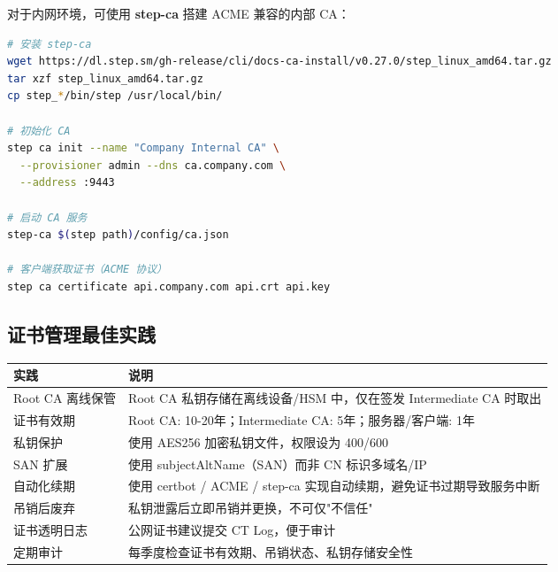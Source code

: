 \documentclass[12pt,UTF8]{ctexbook}
\begin{document}
对于内网环境，可使用 \textbf{step-ca} 搭建 ACME 兼容的内部 CA：

\begin{lstlisting}[language=bash]
# 安装 step-ca
wget https://dl.step.sm/gh-release/cli/docs-ca-install/v0.27.0/step_linux_amd64.tar.gz
tar xzf step_linux_amd64.tar.gz
cp step_*/bin/step /usr/local/bin/

# 初始化 CA
step ca init --name "Company Internal CA" \
  --provisioner admin --dns ca.company.com \
  --address :9443

# 启动 CA 服务
step-ca $(step path)/config/ca.json

# 客户端获取证书（ACME 协议）
step ca certificate api.company.com api.crt api.key
\end{lstlisting}

\subsection{证书管理最佳实践}

\begin{tabular}{|p{3.5cm}|p{8.5cm}|}
\hline
\textbf{实践} & \textbf{说明} \\
\hline
Root CA 离线保管 & Root CA 私钥存储在离线设备/HSM 中，仅在签发 Intermediate CA 时取出 \\
\hline
证书有效期 & Root CA: 10-20年；Intermediate CA: 5年；服务器/客户端: 1年 \\
\hline
私钥保护 & 使用 AES256 加密私钥文件，权限设为 400/600 \\
\hline
SAN 扩展 & 使用 subjectAltName（SAN）而非 CN 标识多域名/IP \\
\hline
自动化续期 & 使用 certbot / ACME / step-ca 实现自动续期，避免证书过期导致服务中断 \\
\hline
吊销后废弃 & 私钥泄露后立即吊销并更换，不可仅"不信任" \\
\hline
证书透明日志 & 公网证书建议提交 CT Log，便于审计 \\
\hline
定期审计 & 每季度检查证书有效期、吊销状态、私钥存储安全性 \\
\hline
\end{tabular}
\end{document}
